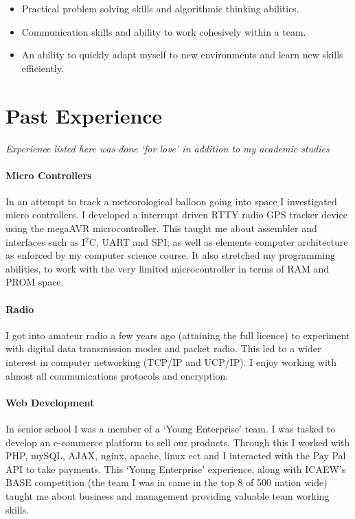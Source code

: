 \documentclass[9pt,a4paper]{article}
\begin{document}
\begin{multicols*}{2}
\begin{itemize}
\item Practical problem solving skills and algorithmic thinking abilities.

\item Communication skills and ability to work cohesively within a team.

\item An ability to quickly adapt myself to new environments and learn new skills efficiently.
\end{itemize}

\section*{Past Experience}
\textit{Experience listed here was done `for love' in addition to my academic studies}

\paragraph{Micro Controllers} In an attempt to track a meteorological balloon going into space I investigated micro controllers.
I developed a interrupt driven RTTY radio GPS tracker device using the megaAVR microcontroller.
This taught me about assembler and interfaces such as I$^2$C, UART and SPI;
as well as elements computer architecture as enforced by my computer science course.
It also stretched my programming abilities, to work with the very limited microcontroller in terms of RAM and PROM space.
\vspace*{-0.1cm}
\paragraph{Radio} I got into amateur radio a few years ago (attaining the full licence) to experiment with digital data transmission modes and packet radio.
This led to a wider interest in computer networking (TCP/IP and UCP/IP).
I enjoy working with almost all communications protocols and encryption.
\vspace*{-0.1cm}
\paragraph{Web Development} In senior school I was a member of a `Young Enterprise' team.
I was tasked to develop an e-commerce platform to sell our products.
Through this I worked with PHP, mySQL, AJAX, nginx, apache, linux ect
and I interacted with the Pay Pal API to take payments.
This `Young Enterprise' experience, along with ICAEW's BASE competition (the team I was in came in the top 8 of 500 nation wide) taught me about business and management providing valuable team working skills.
\vspace*{-0.1cm}

\end{multicols*}
\end{document}
